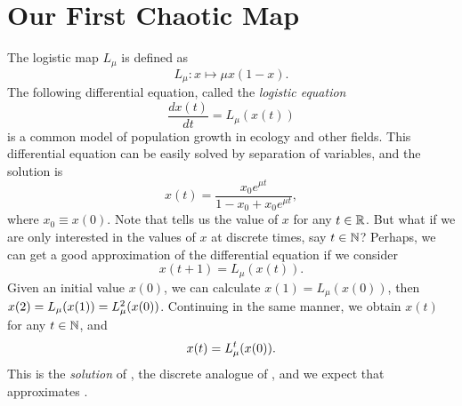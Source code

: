 \documentclass[10pt,twoside,draft]{book}
\begin{document}
\section{Our First Chaotic Map}
The logistic map $L_\mu$ is defined as 
\begin{equation*}
  L_{\mu}: x \mapsto \mu x(1-x).
\end{equation*}
The following differential equation, called the \textit{logistic equation}
\begin{equation}
  \frac{dx(t)}{dt} = L_{\mu}(x(t))
  \label{eqn:lde}
\end{equation}
is a common model of population growth in ecology and other fields.
This differential equation can be easily solved by separation of variables, and the solution is
\begin{equation}
  x(t) = \frac{x_0 e^{\mu t}}{1 - x_0 + x_0 e^{\mu t}},
  \label{eqn:ldesoln}
\end{equation}
where $x_0 \equiv x(0)$.
Note that  tells us the value of $x$ for any $t \in \mathbb{R}$.
But what if we are only interested in the values of $x$ at discrete times, say $t \in \mathbb{N}$?
Perhaps, we can get a good approximation of the differential equation if we consider
\begin{equation}
  x(t + 1) = L_{\mu}(x(t)).
  \label{eqn:logistic}
\end{equation}
Given an initial value $x(0)$, we can calculate $x(1) = L_\mu(x(0))$, then $x(2) = L_\mu(x(1)) = L_\mu^{2}(x(0))$.
Continuing in the same manner, we obtain $x(t)$ for any $t \in \mathbb{N}$, and 
\begin{equation}
  x(t) = L_\mu^{t}(x(0)).
  \label{eqn:logisticsoln}
\end{equation}
This is the \textit{solution} of , the discrete analogue of , and we expect that  approximates .
\end{document}
